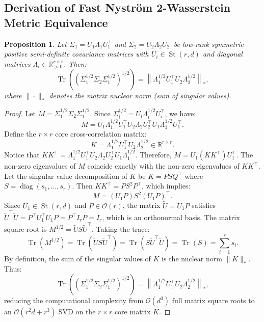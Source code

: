 \documentclass[10pt,twocolumn,letterpaper]{article}
\newtheorem{proposition}{Proposition}
\begin{document}
\subsection{Derivation of Fast Nystr\"om 2-Wasserstein Metric Equivalence}
\begin{proposition}
Let $\Sigma_1 = U_1 \Lambda_1 U_1^\top$ and $\Sigma_2 = U_2 \Lambda_2 U_2^\top$ be low-rank symmetric positive semi-definite covariance matrices with $U_i \in \operatorname{St}(r, d)$ and diagonal matrices $\Lambda_i \in \mathbb{R}^{r \times r}_{>0}$. Then:
\begin{equation}
\operatorname{Tr}\left(\left(\Sigma_1^{1/2} \Sigma_2 \Sigma_1^{1/2}\right)^{1/2}\right) = \left\| \Lambda_1^{1/2} U_1^\top U_2 \Lambda_2^{1/2} \right\|_*,
\end{equation}
where $\|\cdot\|_*$ denotes the matrix nuclear norm (sum of singular values).
\end{proposition}
\begin{proof}
Let $M = \Sigma_1^{1/2} \Sigma_2 \Sigma_1^{1/2}$. Since $\Sigma_i^{1/2} = U_i \Lambda_i^{1/2} U_i^\top$, we have:
\begin{equation}
M = U_1 \Lambda_1^{1/2} U_1^\top U_2 \Lambda_2 U_2^\top U_1 \Lambda_1^{1/2} U_1^\top.
\end{equation}
Define the $r \times r$ core cross-correlation matrix:
\begin{equation}
K = \Lambda_1^{1/2} U_1^\top U_2 \Lambda_2^{1/2} \in \mathbb{R}^{r \times r}.
\end{equation}
Notice that $K K^\top = \Lambda_1^{1/2} U_1^\top U_2 \Lambda_2 U_2^\top U_1 \Lambda_1^{1/2}$.
Therefore, $M = U_1 (K K^\top) U_1^\top$.
The non-zero eigenvalues of $M$ coincide exactly with the non-zero eigenvalues of $K K^\top$. Let the singular value decomposition of $K$ be $K = P S Q^\top$ where $S = \operatorname{diag}(s_1, \dots, s_r)$.
Then $K K^\top = P S^2 P^\top$, which implies:
\begin{equation}
M = (U_1 P) S^2 (U_1 P)^\top.
\end{equation}
Since $U_1 \in \operatorname{St}(r, d)$ and $P \in \mathcal{O}(r)$, the matrix $\tilde{U} = U_1 P$ satisfies $\tilde{U}^\top \tilde{U} = P^\top U_1^\top U_1 P = P^\top I_r P = I_r$, which is an orthonormal basis.
The matrix square root is $M^{1/2} = \tilde{U} S \tilde{U}^\top$.
Taking the trace:
\begin{equation}
\operatorname{Tr}(M^{1/2}) = \operatorname{Tr}(\tilde{U} S \tilde{U}^\top) = \operatorname{Tr}(S \tilde{U}^\top \tilde{U}) = \operatorname{Tr}(S) = \sum_{i=1}^r s_i.
\end{equation}
By definition, the sum of the singular values of $K$ is the nuclear norm $\|K\|_*$. Thus:
\begin{equation}
\operatorname{Tr}\left(\left(\Sigma_1^{1/2} \Sigma_2 \Sigma_1^{1/2}\right)^{1/2}\right) = \left\| \Lambda_1^{1/2} U_1^\top U_2 \Lambda_2^{1/2} \right\|_*,
\end{equation}
reducing the computational complexity from $\mathcal{O}(d^3)$ full matrix square roots to an $\mathcal{O}(r^2 d + r^3)$ SVD on the $r \times r$ core matrix $K$.
\end{proof}
\end{document}
